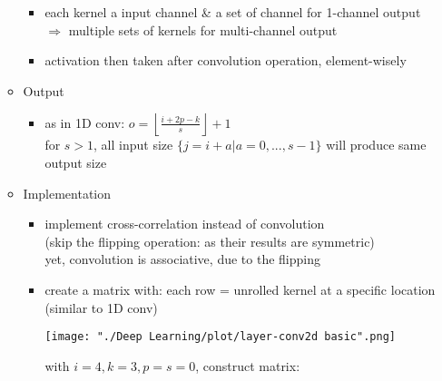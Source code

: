 \begin{itemize}
\begin{itemize}
\begin{itemize}
		\item each kernel a input channel \& a set of channel for 1-channel output \\
		$\Rightarrow$ multiple sets of kernels for multi-channel output
		\item activation then taken after convolution operation, element-wisely
		\end{itemize}
	\item Output
		\begin{itemize}
		\item as in 1D conv: $\displaystyle o = \left\lfloor\frac {i+2p-k} {s} \right\rfloor + 1$ \\
		for $s>1$, all input size $\{j=i+a | a = 0,...,s-1\}$ will produce same output size 
		\end{itemize}
	\item Implementation
		\begin{itemize}
		\item implement cross-correlation instead of convolution \\
		(skip the flipping operation: as their results are symmetric) \\
		yet, convolution is associative, due to the flipping
		\item create a matrix with: each row = unrolled kernel at a specific location \\
		(similar to 1D conv) \\
		\begin{minipage}[l]{.15\linewidth}
		\texttt{[image: "./Deep Learning/plot/layer-conv2d basic".png]} \\
		\end{minipage}
		\begin{minipage}[l]{.85\linewidth}
		with $i=4, k=3, p=s=0$, construct matrix: \\ \\
\end{minipage}
\end{itemize}
\end{itemize}
\end{itemize}
